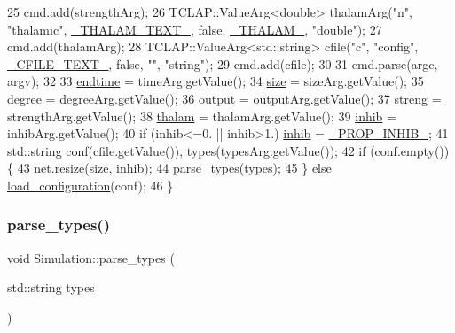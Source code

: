 \begin{DoxyCode}
25     cmd.add(strengthArg);
26     TCLAP::ValueArg<double> thalamArg(\textcolor{stringliteral}{"n"}, \textcolor{stringliteral}{"thalamic"}, \hyperlink{globals_8h_a80eb37fbfc12b802cd576a7c270341a5}{\_THALAM\_TEXT\_},  \textcolor{keyword}{false}, 
      \hyperlink{globals_8h_a4b57d5977068ad6d3ba5e97802c57410}{\_THALAM\_}, \textcolor{stringliteral}{"double"});
27     cmd.add(thalamArg);
28     TCLAP::ValueArg<std::string> cfile(\textcolor{stringliteral}{"c"}, \textcolor{stringliteral}{"config"}, \hyperlink{globals_8h_aba0c47a7a3365cac4542d0d4ffb5d165}{\_CFILE\_TEXT\_}, \textcolor{keyword}{false}, \textcolor{stringliteral}{""}, \textcolor{stringliteral}{"string"});
29     cmd.add(cfile);
30 
31     cmd.parse(argc, argv);
32 
33     \hyperlink{classSimulation_ae57735a4ad942d9d217fb2235a644d1b}{endtime} = timeArg.getValue();
34     \hyperlink{classSimulation_ae198f9ac020ed6bc6ebbd608ab3f959d}{size} = sizeArg.getValue();
35     \hyperlink{classSimulation_ad0197878662d63d3ad1699aa7ffe01b2}{degree} = degreeArg.getValue();
36     \hyperlink{classSimulation_a9ad4c807c6ddf9066041f764f0ccb9dc}{output} = outputArg.getValue();
37     \hyperlink{classSimulation_adfda098679d8fcb864ecd87409087d02}{streng} = strengthArg.getValue();
38     \hyperlink{classSimulation_a7fca2f5f79a662f91736b0e5f30598c1}{thalam} = thalamArg.getValue();
39     \hyperlink{classSimulation_a14c04fb020df35f875b1f5b2aab7a562}{inhib} = inhibArg.getValue();
40     \textcolor{keywordflow}{if} (inhib<=0. || inhib>1.) \hyperlink{classSimulation_a14c04fb020df35f875b1f5b2aab7a562}{inhib} = \hyperlink{globals_8h_a44d0be2c42bc40fe1d6d0006ed762f6d}{\_PROP\_INHIB\_};
41     std::string conf(cfile.getValue()), types(typesArg.getValue());
42     \textcolor{keywordflow}{if} (conf.empty()) \{
43         \hyperlink{classSimulation_a980a224fe68945549f217067ffc74f7c}{net}.\hyperlink{classNetwork_ad91ae24f308dd2b46ff76396fcdb9765}{resize}(\hyperlink{classSimulation_ae198f9ac020ed6bc6ebbd608ab3f959d}{size}, \hyperlink{classSimulation_a14c04fb020df35f875b1f5b2aab7a562}{inhib});
44         \hyperlink{classSimulation_afc095e76c2bcee6d31a4614022d609c3}{parse\_types}(types);
45     \} \textcolor{keywordflow}{else} \hyperlink{classSimulation_acd6ce915b07465d9aaaa5fdcbb5ae077}{load\_configuration}(conf);
46 \}
\end{DoxyCode}
\mbox{\label{classSimulation_afc095e76c2bcee6d31a4614022d609c3}} 
\subsubsection{\texorpdfstring{parse\+\_\+types()}{parse\_types()}}
{\footnotesize\ttfamily void Simulation\+::parse\+\_\+types (\begin{DoxyParamCaption}\item[{std\+::string}]{types }\end{DoxyParamCaption})}

